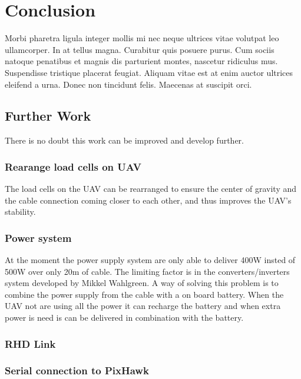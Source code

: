 \chapter{Conclusion}
Morbi pharetra ligula integer mollis mi nec neque ultrices vitae volutpat leo ullamcorper. In at tellus magna. Curabitur quis posuere purus. Cum sociis natoque penatibus et magnis dis parturient montes, nascetur ridiculus mus. Suspendisse tristique placerat feugiat. Aliquam vitae est at enim auctor ultrices eleifend a urna. Donec non tincidunt felis. Maecenas at suscipit orci.

\section{Further Work}
There is no doubt this work can be improved and develop further. 

\subsection*{Rearange load cells on UAV}
The load cells on the UAV can be rearranged to ensure the center of gravity and the cable connection coming closer to each other, and thus improves the UAV's stability.


\subsection*{Power system}
At the moment the power supply system are only able to deliver 400W insted of 500W over only 20m of cable. The limiting factor is in the converters/inverters system developed by Mikkel Wahlgreen. A way of solving this problem is to combine the power supply from the cable with a on board battery. When the UAV not are using all the power it can recharge the battery and when extra power is need is can be delivered in combination with the battery.

\subsection{RHD Link}

\subsection{Serial connection to PixHawk}